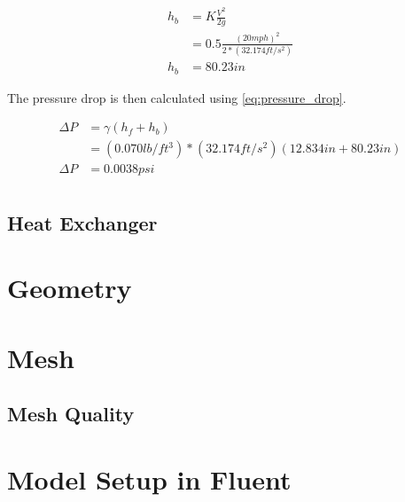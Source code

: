 \documentclass{article}
\begin{document}
\begin{equation}
	\begin{aligned}
		h_b & = K \frac{V^2}{2g}                         \\
		    & = 0.5 \frac{(20 mph)^2}{2*(32.174 ft/s^2)} \\
		h_b & = 80.23 in
	\end{aligned}
	\label{eq:head_loss-bend}
\end{equation}

The pressure drop is then calculated using \autoref{eq:pressure_drop}.

\begin{equation}
	\begin{aligned}
		\Delta P & = \gamma (h_f + h_b)                                    \\
		         & = (0.070 lb/ft^3)*(32.174 ft/s^2)(12.834 in + 80.23 in) \\
		\Delta P & = 0.0038 psi                                            \\
	\end{aligned}
	\label{eq:pressure_drop}
\end{equation}



\subsection{Heat Exchanger}


\section{Geometry}


\section{Mesh}


\subsection{Mesh Quality}


\section{Model Setup in Fluent}
\end{document}
